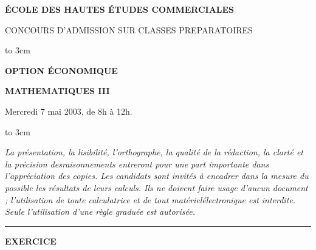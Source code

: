 \documentclass[11pt]{article}%
\begin{document}
\vbox{} \vskip 3cm

\begin{center}
{\Large {\textbf{ÉCOLE DES HAUTES ÉTUDES COMMERCIALES}} \vspace{0.3cm}
}

{\normalsize CONCOURS D'ADMISSION SUR CLASSES PREPARATOIRES
\vspace{0.5cm}}

{\normalsize \hskip 0.0cm\hbox to 3cm{\hrulefill}}

{\normalsize \vspace{0.3cm} }

{\normalsize \textbf{OPTION ÉCONOMIQUE} \vspace{0.5cm} }

{\Large {\textbf{MATHEMATIQUES III}} \vspace{0.5cm} }

{\normalsize Mercredi 7 mai 2003, de 8h à 12h.}

{\normalsize \hskip 0.0cm\hbox to 3cm{\hrulefill}}

{\normalsize \vspace{0.3cm} }
\end{center}

\textit{La présentation, la lisibilité, l'orthographe, la qualité de
la rédaction, la clarté et la précision des\hfill\break raisonnements
entreront pour une part importante dans l'appréciation des copies.
\hfill\break Les candidats sont invités à encadrer dans la mesure du
possible les résultats de leurs calculs. \hfill\break Ils ne doivent
faire
usage d'aucun document ; l'utilisation de toute calculatrice et de tout
matériel\break électronique est interdite. \hfill\break Seule
l'utilisation d'une règle graduée est autorisée.} \vspace{0.5cm}

\hrule
\vspace{0.5cm}

\begin{center}
\textbf{EXERCICE}
\end{center}
\end{document}
